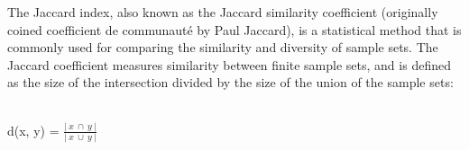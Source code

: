 \documentclass[9pt]{extarticle} %
\begin{document}
\begin{minipage}[t]{.56\linewidth} %
\vspace{-0.4cm}
\hypertarget{firstnews}{}

The Jaccard index, also known as the Jaccard similarity coefficient (originally coined coefficient de communauté by Paul Jaccard), is a statistical method that is commonly used for comparing the similarity and diversity of sample sets. The Jaccard coefficient measures similarity between finite sample sets, and is defined as the size of the intersection divided by the size of the union of the sample sets: \\
\\
\begingroup
    \fontsize{18pt}{12pt}\selectfont
	\centerline{d(x, y) = $\frac{\vert\ x\ \cap\ y\ \vert}{\vert\ x\ \cup\ y\ \vert}$}
\endgroup
\\


\end{minipage}
\end{document}
